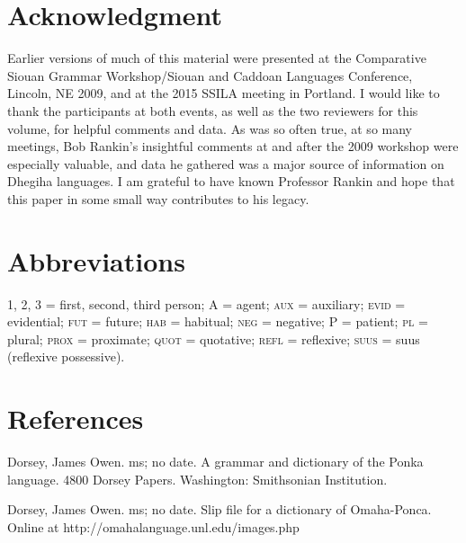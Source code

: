 \documentclass[output=paper]{LSP/langsci}
\begin{document}
\section*{Acknowledgment}

Earlier versions of much of this material were presented at the Comparative Siouan Grammar Workshop/Siouan and Caddoan Languages Conference, Lincoln, NE 2009, and at the 2015 SSILA meeting in Portland. I would like to thank the participants at both events, as well as the two reviewers for this volume, for helpful comments and data. As was so often true, at so many meetings, Bob Rankin's insightful comments at and after the 2009 workshop were especially valuable, and data he gathered was a major source of information on Dhegiha languages. I am grateful to have known Professor Rankin and hope that this paper in some small way contributes to his legacy.

\section*{Abbreviations}

1, 2, 3 = first, second, third person; A = agent; \textsc{aux} = auxiliary; \textsc{evid} = evidential; \textsc{fut} = future; \textsc{hab} = habitual; \textsc{neg} = negative; P = patient; \textsc{pl} = plural; \textsc{prox} = proximate; \textsc{quot} = quotative; \textsc{refl} = reflexive; \textsc{suus} = suus (reflexive possessive). 

\section*{References}

\printbibliography[heading=subbibliography,notkeyword=this]

\begin{reflist}
  

Dorsey, James Owen. ms; no date. A grammar and dictionary of the Ponka language. 4800 Dorsey Papers. Washington: Smithsonian Institution.

Dorsey, James Owen. ms; no date. Slip file for a dictionary of Omaha-Ponca. Online at http://omahalanguage.unl.edu/images.php
 
\end{reflist}
\end{document}
